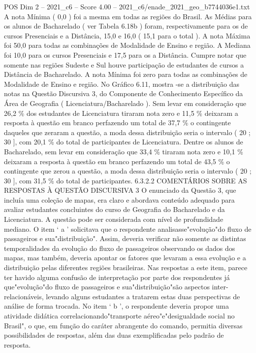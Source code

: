 \begin{textsample}{POS Dim 2 – 2021\_c6 – Score 4.00 – 2021\_c6/enade\_2021\_geo\_b7744036e1.txt}
A nota Mínima ( 0,0 ) foi a mesma em todas as regiões do Brasil.
As Médias para os alunos de Bacharelado ( ver Tabela 6.18b ) foram, respectivamente para os de cursos Presenciais e a Distância, 15,0 e 16,0 ( 15,1 para o total ).
A nota Máxima foi 50,0 para todas as combinações de Modalidade de Ensino e região.
A Mediana foi 10,0 para os cursos Presenciais e 17,5 para os a Distância.
Cumpre notar que somente nas regiões Sudeste e Sul houve participação de estudantes de cursos a Distância de Bacharelado.
A nota Mínima foi zero para todas as combinações de Modalidade de Ensino e região.
No Gráfico 6.11, mostra -se a distribuição das notas na Questão Discursiva 3, do Componente de Conhecimento Específico da Área de Geografia ( Licenciatura/Bacharelado ).
Sem levar em consideração que 26,2 \% dos estudantes de Licenciatura tiraram nota zero e 11,5 \% deixaram a resposta à questão em branco perfazendo um total de 37,7 \% o contingente daqueles que zeraram a questão, a moda dessa distribuição seria o intervalo ( 20 ; 30 ], com 20,1 \% do total de participantes de Licenciatura.
Dentre os alunos de Bacharelado, sem levar em consideração que 33,4 \% tiraram nota zero e 10,1 \% deixaram a resposta à questão em branco perfazendo um total de 43,5 \% o contingente que zerou a questão, a moda dessa distribuição seria o intervalo ( 20 ; 30 ], com 31,5 \% do total de participantes. 6.3.2.2 COMENTÁRIOS SOBRE AS RESPOSTAS À QUESTÃO DISCURSIVA 3 O enunciado da Questão 3, que incluía uma coleção de mapas, era claro e abordava conteúdo adequado para avaliar estudantes concluintes do curso de Geografia do Bacharelado e da Licenciatura.
A questão pode ser considerada com nível de profundidade mediano.
O item ‘ a ’ solicitava que o respondente analisasse"evolução"do fluxo de passageiros e sua"distribuição".
Assim, deveria verificar não somente as distintas temporalidades da evolução do fluxo de passageiros observando os dados dos mapas, mas também, deveria apontar os fatores que levaram a essa evolução e a distribuição pelas diferentes regiões brasileiras.
Nas respostas a este item, parece ter havido alguma confusão de interpretação por parte dos respondentes já que"evolução"do fluxo de passageiros e sua"distribuição"são aspectos inter-relacionáveis, levando alguns estudantes a tratarem estas duas perspectivas de análise de forma trocada.
No item ‘ b ’, o respondente deveria propor uma atividade didática correlacionando"transporte aéreo"e"desigualdade social no Brasil", o que, em função do caráter abrangente do comando, permitia diversas possibilidades de respostas, além das duas exemplificadas pelo padrão de resposta.

\end{textsample}
